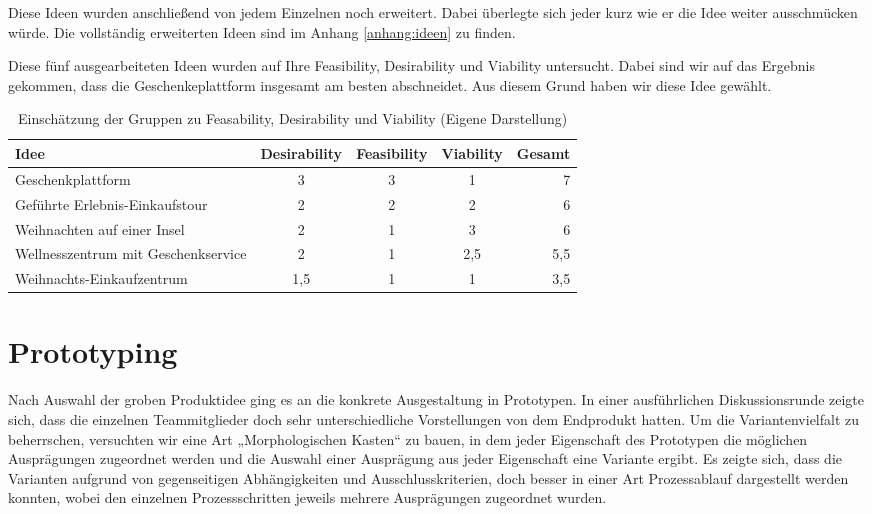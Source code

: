 \documentclass[12pt,ngerman, fleqn]{book} %
\begin{document}
Diese Ideen wurden anschließend von jedem Einzelnen noch erweitert. Dabei überlegte sich jeder kurz wie er die Idee weiter ausschmücken würde. Die vollständig erweiterten Ideen sind im Anhang \ref{anhang:ideen} zu finden.

Diese fünf ausgearbeiteten Ideen wurden auf Ihre Feasibility, Desirability und Viability untersucht. Dabei sind wir auf das Ergebnis gekommen, dass die Geschenkeplattform insgesamt am besten abschneidet. Aus diesem Grund haben wir diese Idee gewählt.

\begin{table}[ht]
\begin{center}
\begin{tabular}{l*{3}{c}r}
Idee & Desirability & Feasibility & Viability & Gesamt\\
\hline
Geschenkplattform & 3  & 3 & 1 & 7\\
Geführte Erlebnis-Einkaufstour & 2  & 2 & 2 & 6 \\
Weihnachten auf einer Insel & 2  & 1 & 3 & 6\\
Wellnesszentrum mit Geschenkservice & 2 & 1 & 2,5 & 5,5\\
Weihnachts-Einkaufzentrum & 1,5 & 1 & 1 & 3,5\\
\hline
\end{tabular}
\end{center}
\caption{Einschätzung der Gruppen zu Feasability, Desirability und Viability (Eigene Darstellung)}
\label{tab:feasability}
\end{table}%


\chapter{Prototyping}
\setcounter{page}{14}

Nach Auswahl der groben Produktidee ging es an die konkrete Ausgestaltung in Prototypen. In einer ausführlichen Diskussionsrunde zeigte sich, dass die einzelnen Teammitglieder doch sehr unterschiedliche Vorstellungen von dem Endprodukt hatten. Um die Variantenvielfalt zu beherrschen, versuchten wir eine Art „Morphologischen Kasten“ zu bauen, in dem jeder Eigenschaft des Prototypen die möglichen Ausprägungen zugeordnet werden und die Auswahl einer Ausprägung aus jeder Eigenschaft eine Variante ergibt. Es zeigte sich, dass die Varianten aufgrund von gegenseitigen Abhängigkeiten und Ausschlusskriterien, doch besser in einer Art Prozessablauf dargestellt werden konnten, wobei den einzelnen Prozessschritten jeweils mehrere Ausprägungen zugeordnet wurden.\\
\end{document}
